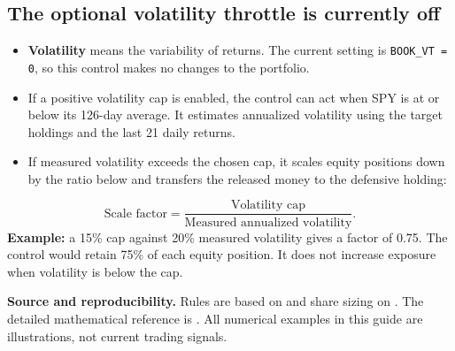 \documentclass[11pt,letterpaper]{article}
\newcommand{\topic}[1]{\Needspace{5\baselineskip}\subsection*{#1}}
\newcommand{\word}[1]{\text{#1}}
\begin{document}
\topic{The optional volatility throttle is currently off}
\begin{itemize}
\item \textbf{Volatility} means the variability of returns. The current setting is \texttt{BOOK\_VT = 0}, so this control makes no changes to the portfolio.
\item If a positive volatility cap is enabled, the control can act when SPY is at or below its 126-day average. It estimates annualized volatility using the target holdings and the last 21 daily returns.
\item If measured volatility exceeds the chosen cap, it scales equity positions down by the ratio below and transfers the released money to the defensive holding:
\end{itemize}
\[
\word{Scale factor}=\frac{\word{Volatility cap}}{\word{Measured annualized volatility}}.
\]
\textbf{Example:} a 15\% cap against 20\% measured volatility gives a factor of 0.75. The control would retain 75\% of each equity position. It does not increase exposure when volatility is below the cap.

\vfill
{\footnotesize\textbf{Source and reproducibility.} Rules are based on  and share sizing on . The detailed mathematical reference is . All numerical examples in this guide are illustrations, not current trading signals.}
\end{document}

